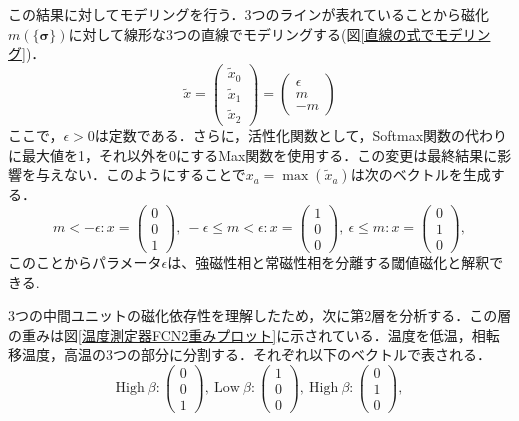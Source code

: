 \documentclass[a4paper,11pt]{jsreport}
\begin{document}
この結果に対してモデリングを行う．3つのラインが表れていることから磁化$m(\{\bm{\sigma}\})$に対して線形な3つの直線でモデリングする(図\ref{直線の式でモデリング})．
\begin{equation}
  \tilde{x} =
  \begin{pmatrix}
    \tilde{x}_0 \\ \tilde{x}_1 \\ \tilde{x}_2
  \end{pmatrix}
  =
  \begin{pmatrix}
    \epsilon \\ m \\ -m
  \end{pmatrix}
\end{equation}
ここで，$\epsilon > 0$は定数である．さらに，活性化関数として，Softmax関数の代わりに最大値を1，それ以外を0にするMax関数を使用する．この変更は最終結果に影響を与えない．このようにすることで$x_a = \max{(\tilde{x}_a)}$は次のベクトルを生成する．
\begin{equation}
  m<-\epsilon : x=
  \begin{pmatrix}
    0 \\ 0 \\ 1
  \end{pmatrix}, \
  -\epsilon \leq m < \epsilon : x=
  \begin{pmatrix}
    1 \\ 0 \\ 0
  \end{pmatrix}, \
  \epsilon \leq m : x=
  \begin{pmatrix}
    0 \\ 1 \\ 0
  \end{pmatrix},
\end{equation}
このことからパラメータ$\epsilon$は、強磁性相と常磁性相を分離する閾値磁化と解釈できる.\par
3つの中間ユニットの磁化依存性を理解したため，次に第2層を分析する．この層の重みは図\ref{温度測定器FCN2重みプロット}に示されている．温度を低温，相転移温度，高温の3つの部分に分割する．それぞれ以下のベクトルで表される．
\begin{equation}
  \text{High} \ \beta :
  \begin{pmatrix}
    0 \\ 0 \\ 1
  \end{pmatrix}, \
  \text{Low} \ \beta :
  \begin{pmatrix}
    1 \\ 0 \\ 0
  \end{pmatrix}, \
  \text{High} \ \beta :
  \begin{pmatrix}
    0 \\ 1 \\ 0
  \end{pmatrix},
\end{equation}
\end{document}
